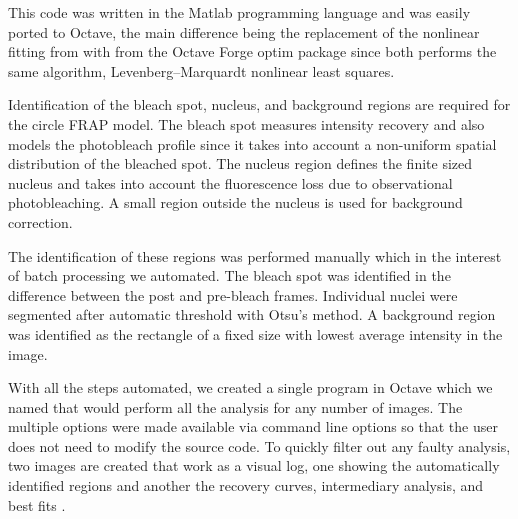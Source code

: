 This code was written in the Matlab programming language and was
easily ported to Octave, the main difference being the replacement of
the nonlinear fitting from  with 
from the Octave Forge optim package since both performs the same
algorithm, Levenberg--Marquardt nonlinear least squares.

Identification of the bleach spot, nucleus, and background regions are
required for the circle FRAP model.  The bleach spot measures
intensity recovery and also models the photobleach profile since it
takes into account a non-uniform spatial distribution of the bleached
spot.  The nucleus region defines the finite sized nucleus and takes
into account the fluorescence loss due to observational
photobleaching.  A small region outside the nucleus is used for
background correction.

The identification of these regions was performed manually which in
the interest of batch processing we automated.  The bleach spot was
identified in the difference between the post and pre-bleach frames.
Individual nuclei were segmented after automatic threshold with Otsu's
method.  A background region was identified as the rectangle of a
fixed size with lowest average intensity in the image.

With all the steps automated, we created a single program in Octave
which we named  that would perform all the
analysis for any number of images.  The multiple options were made
available via command line options so that the user does not need to
modify the source code.  To quickly filter out any faulty analysis,
two images are created that work as a visual log, one showing the
automatically identified regions  and another
the recovery curves, intermediary analysis, and best fits
.

